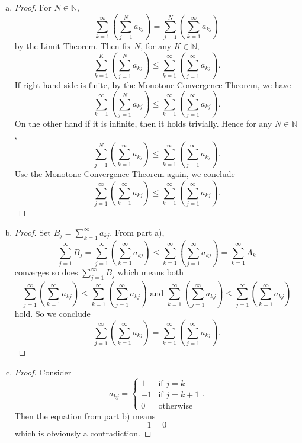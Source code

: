 \documentclass{report}
\begin{document}
\vspace{12pt}
\begin{Exercise}
\begin{enumerate}[a)]
\item 
\begin{proof}
For $N\in\mathbb{N}$, $$ \sum_{k=1}^{\infty}\left( \sum_{j=1}^{N}a_{kj} \right) = \sum_{j=1}^{N}\left( \sum_{k=1}^{\infty}a_{kj} \right) $$ by the Limit Theorem. Then fix $N$, for any $K\in\mathbb{N}$, $$ \sum_{k=1}^{K}\left( \sum_{j=1}^{N}a_{kj} \right) \leq \sum_{k=1}^{\infty}\left( \sum_{j=1}^{\infty}a_{kj} \right).$$
If right hand side is finite, by the Monotone Convergence Theorem, we have $$\sum_{k=1}^{\infty}\left( \sum_{j=1}^{N}a_{kj} \right) \leq \sum_{k=1}^{\infty}\left( \sum_{j=1}^{\infty}a_{kj} \right).$$
On the other hand if it is infinite, then it holds trivially. Hence for any $N\in\mathbb{N}$, $$\sum_{j=1}^{N}\left( \sum_{k=1}^{\infty}a_{kj} \right) \leq \sum_{k=1}^{\infty}\left( \sum_{j=1}^{\infty}a_{kj} \right).$$ Use the Monotone Convergence Theorem again, we conclude $$\sum_{j=1}^{\infty}\left( \sum_{k=1}^{\infty}a_{kj} \right) \leq \sum_{k=1}^{\infty}\left( \sum_{j=1}^{\infty}a_{kj} \right).$$
\end{proof}

\item
\begin{proof}
Set $B_j = \sum_{k=1}^{\infty}a_{kj}$. From part a), $$ \sum_{j=1}^{\infty}B_j = \sum_{j=1}^{\infty}\left( \sum_{k=1}^{\infty}a_{kj} \right) \leq \sum_{k=1}^{\infty}\left( \sum_{j=1}^{\infty}a_{kj} \right) = \sum_{k=1}^{\infty}A_k$$ converges so does $\sum_{j=1}^{\infty}B_j$ which means both $$\sum_{j=1}^{\infty}\left( \sum_{k=1}^{\infty}a_{kj} \right) \leq \sum_{k=1}^{\infty}\left( \sum_{j=1}^{\infty}a_{kj} \right) \mbox{ and } \sum_{k=1}^{\infty}\left( \sum_{j=1}^{\infty}a_{kj} \right) \leq \sum_{j=1}^{\infty}\left( \sum_{k=1}^{\infty}a_{kj} \right) $$ hold. So we conclude $$\sum_{j=1}^{\infty}\left( \sum_{k=1}^{\infty}a_{kj} \right) = \sum_{k=1}^{\infty}\left( \sum_{j=1}^{\infty}a_{kj} \right).$$
\end{proof}

\item
\begin{proof}
Consider $$a_{kj} = \begin{cases}1 & \mbox{if } j=k \\
-1 & \mbox{if }j=k+1 \\
0 & \mbox{otherwise} \end{cases}.$$
Then the equation from part b) means $$ 1 = 0 $$ which is obviously a contradiction.
\end{proof}
\end{enumerate}
\end{Exercise}
\end{document}
